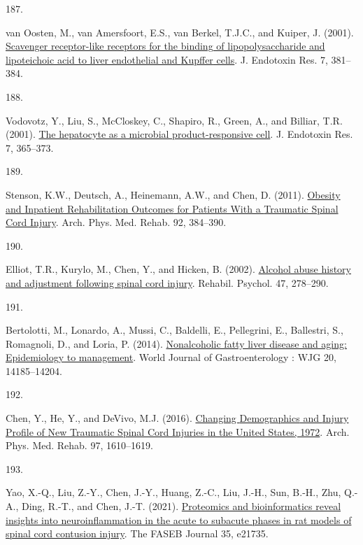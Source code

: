 \documentclass[
]{article}
\newlength{\cslhangindent}
\newlength{\csllabelwidth}
\newlength{\cslentryspacingunit} %
\newenvironment{CSLReferences}[2] %
 {%
  \setlength{\parindent}{0pt}
  \ifodd #1
  \let\oldpar\par
  \def\par{\hangindent=\cslhangindent\oldpar}
  \fi
  \setlength{\parskip}{#2\cslentryspacingunit}
 }%
 {}
\newcommand{\CSLLeftMargin}[1]{\parbox[t]{\csllabelwidth}{#1}}
\newcommand{\CSLRightInline}[1]{\parbox[t]{\linewidth - \csllabelwidth}{#1}\break}
\begin{document}
\begin{CSLReferences}{0}{0}
\leavevmode{}%
\CSLLeftMargin{187. }
\CSLRightInline{van Oosten, M., van Amersfoort, E.S., van Berkel, T.J.C., and Kuiper, J. (2001). \href{https://doi.org/10.1177/09680519010070050601}{Scavenger receptor-like receptors for the binding of lipopolysaccharide and lipoteichoic acid to liver endothelial and {Kupffer} cells}. J. Endotoxin Res. 7, 381--384.}

\leavevmode{}%
\CSLLeftMargin{188. }
\CSLRightInline{Vodovotz, Y., Liu, S., McCloskey, C., Shapiro, R., Green, A., and Billiar, T.R. (2001). \href{https://doi.org/10.1177/09680519010070050401}{The hepatocyte as a microbial product-responsive cell}. J. Endotoxin Res. 7, 365--373.}

\leavevmode{}%
\CSLLeftMargin{189. }
\CSLRightInline{Stenson, K.W., Deutsch, A., Heinemann, A.W., and Chen, D. (2011). \href{https://doi.org/10.1016/j.apmr.2010.07.235}{Obesity and {Inpatient Rehabilitation Outcomes} for {Patients With} a {Traumatic Spinal Cord Injury}}. Arch. Phys. Med. Rehab. 92, 384--390.}

\leavevmode{}%
\CSLLeftMargin{190. }
\CSLRightInline{Elliot, T.R., Kurylo, M., Chen, Y., and Hicken, B. (2002). \href{https://doi.org/10.1037/0090-5550.47.3.278}{Alcohol abuse history and adjustment following spinal cord injury}. Rehabil. Psychol. 47, 278--290.}

\leavevmode{}%
\CSLLeftMargin{191. }
\CSLRightInline{Bertolotti, M., Lonardo, A., Mussi, C., Baldelli, E., Pellegrini, E., Ballestri, S., Romagnoli, D., and Loria, P. (2014). \href{https://doi.org/10.3748/wjg.v20.i39.14185}{Nonalcoholic fatty liver disease and aging: {Epidemiology} to management}. World Journal of Gastroenterology : WJG 20, 14185--14204.}

\leavevmode{}%
\CSLLeftMargin{192. }
\CSLRightInline{Chen, Y., He, Y., and DeVivo, M.J. (2016). \href{https://doi.org/10.1016/j.apmr.2016.03.017}{Changing {Demographics} and {Injury Profile} of {New Traumatic Spinal Cord Injuries} in the {United States}, 1972\textendash 2014}. Arch. Phys. Med. Rehab. 97, 1610--1619.}

\leavevmode{}%
\CSLLeftMargin{193. }
\CSLRightInline{Yao, X.-Q., Liu, Z.-Y., Chen, J.-Y., Huang, Z.-C., Liu, J.-H., Sun, B.-H., Zhu, Q.-A., Ding, R.-T., and Chen, J.-T. (2021). \href{https://doi.org/10.1096/fj.202100081RR}{Proteomics and bioinformatics reveal insights into neuroinflammation in the acute to subacute phases in rat models of spinal cord contusion injury}. The FASEB Journal 35, e21735.}


\end{CSLReferences}
\end{document}
